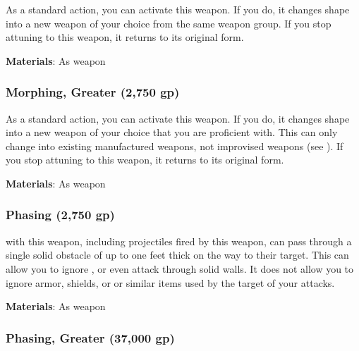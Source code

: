 As a standard action, you can activate this weapon.
If you do, it changes shape into a new weapon of your choice from the same weapon group.
If you stop attuning to this weapon, it returns to its original form.



\vspace{0.25em}
\textbf{Materials}: As weapon


\lowercase{\hypertarget{item:Morphing, Greater}{}}\label{item:Morphing, Greater}
\hypertarget{item:Morphing, Greater}{\subsubsection{Morphing, Greater\hfill{} (2,750 gp)}}

As a standard action, you can activate this weapon.
If you do, it changes shape into a new weapon of your choice that you are proficient with.
This can only change into existing manufactured weapons, not improvised weapons (see ).
If you stop attuning to this weapon, it returns to its original form.



\vspace{0.25em}
\textbf{Materials}: As weapon


\lowercase{\hypertarget{item:Phasing}{}}\label{item:Phasing}
\hypertarget{item:Phasing}{\subsubsection{Phasing\hfill{} (2,750 gp)}}

 with this weapon, including projectiles fired by this weapon, can pass through a single solid obstacle of up to one feet thick on the way to their target.
This can allow you to ignore , or even attack through solid walls.
It does not allow you to ignore armor, shields, or or similar items used by the target of your attacks.



\vspace{0.25em}
\textbf{Materials}: As weapon


\lowercase{\hypertarget{item:Phasing, Greater}{}}\label{item:Phasing, Greater}
\hypertarget{item:Phasing, Greater}{\subsubsection{Phasing, Greater\hfill{} (37,000 gp)}}

